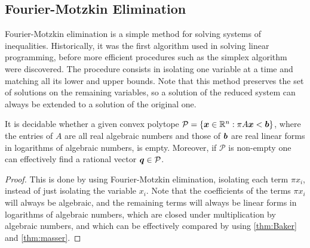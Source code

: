 \subsection{Fourier-Motzkin Elimination}

Fourier-Motzkin elimination is a simple method for solving systems of
inequalities. Historically, it was the first algorithm used in solving
linear programming, before more efficient procedures such as the
simplex algorithm were discovered. The procedure consists in isolating one
variable at a time and matching all its lower and upper bounds. Note
that this method preserves the set of solutions on the remaining
variables, so a solution of the reduced system can always be extended
to a solution of the original one.

\begin{theorem}
\label{thm:fme}
  It is decidable whether a
  given convex polytope
  $\mathcal{P} = \lbrace \boldsymbol{x} \in \mathbb{R}^{n} : \pi
  A\boldsymbol{x} < \boldsymbol{b} \rbrace$,
  where the entries of $A$ are all real algebraic numbers and
  those of $\boldsymbol{b}$ are real linear forms in logarithms of
  algebraic numbers, is empty.  Moreover, if $\mathcal{P}$ is
  non-empty one can effectively find a rational vector
  $\boldsymbol{q} \in \mathcal{P}$.
\end{theorem}

\begin{proof}
This is done by using Fourier-Motzkin elimination, isolating each term $\pi x_{i}$, instead of just isolating the variable $x_{i}$. Note that the coefficients of the terms $\pi x_{i}$ will always be algebraic, and the remaining terms will always be linear forms in logarithms of algebraic numbers, which are closed under multiplication by algebraic numbers, and which can be effectively compared by using \cref{thm:Baker} and \cref{thm:masser}.
\end{proof}
